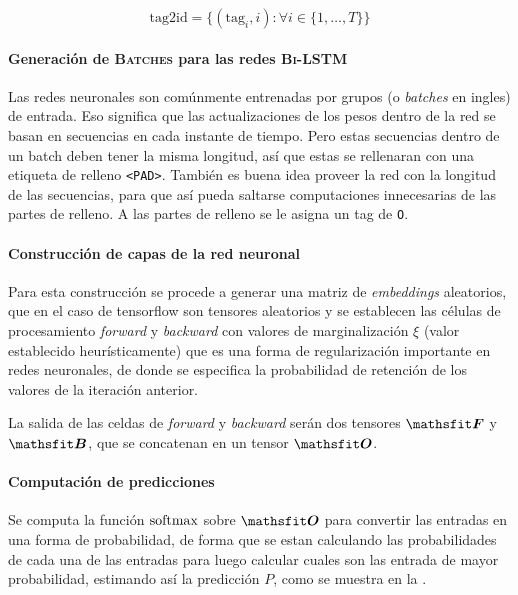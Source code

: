 \begin{equation} \label{eq:lstm-tag2id}
  \text{tag2id} = \Big\{(\text{tag}_i, i) : \forall i \in \{1, \ldots, T\} \Big\}
\end{equation}

\paragraph{Generación de \textsc{Batches} para las redes \textsc{Bi-LSTM}}
Las redes neuronales son comúnmente entrenadas por grupos (o \emph{batches} en ingles) de entrada. Eso significa que las actualizaciones de los pesos dentro de la red se basan en secuencias en cada instante de tiempo. Pero estas secuencias dentro de un batch deben tener la misma longitud, así que estas se rellenaran con una etiqueta de relleno \texttt{<PAD>}. También es buena idea proveer la red con la longitud de las secuencias, para que así pueda saltarse computaciones innecesarias de las partes de relleno. A las partes de relleno se le asigna un tag de \texttt{O}.

\paragraph{Construcción de capas de la red neuronal}
Para esta construcción se procede a generar una matriz de \emph{embeddings} aleatorios, que en el caso de \gls{tensorflow} son tensores aleatorios y se establecen las células de procesamiento \emph{forward} y \emph{backward} con valores de marginalización $\xi$ (valor establecido heurísticamente) que es una forma de regularización importante en redes neuronales, de donde se especifica la probabilidad de retención de los valores de la iteración anterior.

La salida de las celdas de \emph{forward} y \emph{backward} serán dos tensores $\tF$ y $\tB$, que se concatenan en un tensor $\tO$.

\paragraph{Computación de predicciones}
Se computa la función $\mathrm{softmax}$ sobre $\tO$ para convertir las entradas en una forma de probabilidad, de forma que se estan calculando las probabilidades de cada una de las entradas para luego calcular cuales son las entrada de mayor probabilidad, estimando así la predicción $P$, como se muestra en la .


